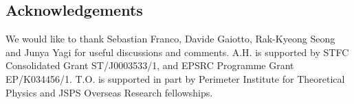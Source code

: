 \documentclass{article}
\numberwithin{equation}{section}
\begin{document}
\subsection*{Acknowledgements}
We would like to thank Sebastian Franco, Davide Gaiotto, Rak-Kyeong Seong and Junya Yagi for useful discussions and comments. 
A.H. is supported by STFC Consolidated Grant ST/J0003533/1, and EPSRC Programme Grant EP/K034456/1. 
T.O. is supported in part by Perimeter Institute for Theoretical Physics and 
JSPS Overseas Research fellowships. 





















































\end{document}
